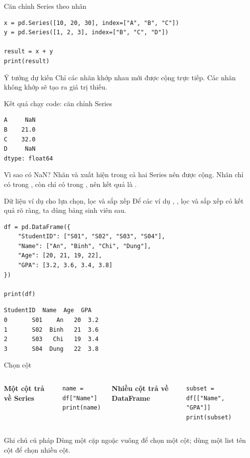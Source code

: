 \documentclass[aspectratio=169,11pt]{beamer}
\newcommand{\cmd}[1]{\texttt{\detokenize{#1}}}
\begin{document}
\begin{frame}[fragile]{Căn chỉnh Series theo nhãn}
\small
\begin{lstlisting}[style=py]
x = pd.Series([10, 20, 30], index=["A", "B", "C"])
y = pd.Series([1, 2, 3], index=["B", "C", "D"])

result = x + y
print(result)
\end{lstlisting}
\begin{block}{Ý tưởng dự kiến}
Chỉ các nhãn khớp nhau mới được cộng trực tiếp. Các nhãn không khớp sẽ tạo ra giá trị thiếu.
\end{block}
\end{frame}

\begin{frame}[fragile]{Kết quả chạy code: căn chỉnh Series}
\small
\begin{lstlisting}[style=py]
A     NaN
B    21.0
C    32.0
D     NaN
dtype: float64
\end{lstlisting}
\begin{block}{Vì sao có NaN?}
Nhãn \cmd{B} và \cmd{C} xuất hiện trong cả hai Series nên được cộng. Nhãn \cmd{A} chỉ có trong \cmd{x}, còn \cmd{D} chỉ có trong \cmd{y}, nên kết quả là \cmd{NaN}.
\end{block}
\end{frame}


\begin{frame}[fragile]{Dữ liệu ví dụ cho lựa chọn, lọc và sắp xếp}
\small
Để các ví dụ \cmd{loc}, \cmd{iloc}, lọc và sắp xếp có kết quả rõ ràng, ta dùng bảng sinh viên sau.
\begin{lstlisting}[style=py]
df = pd.DataFrame({
    "StudentID": ["S01", "S02", "S03", "S04"],
    "Name": ["An", "Binh", "Chi", "Dung"],
    "Age": [20, 21, 19, 22],
    "GPA": [3.2, 3.6, 3.4, 3.8]
})

print(df)
\end{lstlisting}
\begin{lstlisting}[style=py]
  StudentID  Name  Age  GPA
0       S01    An   20  3.2
1       S02  Binh   21  3.6
2       S03   Chi   19  3.4
3       S04  Dung   22  3.8
\end{lstlisting}
\end{frame}

\begin{frame}[fragile]{Chọn cột}
\small
\begin{columns}[T]
\textbf{Một cột trả về Series}
\begin{lstlisting}[style=py]
name = df["Name"]
print(name)
\end{lstlisting}
\textbf{Nhiều cột trả về DataFrame}
\begin{lstlisting}[style=py]
subset = df[["Name", "GPA"]]
print(subset)
\end{lstlisting}
\end{columns}
\begin{block}{Ghi chú cú pháp}
Dùng một cặp ngoặc vuông để chọn một cột; dùng một list tên cột để chọn nhiều cột.
\end{block}
\end{frame}
\end{document}
